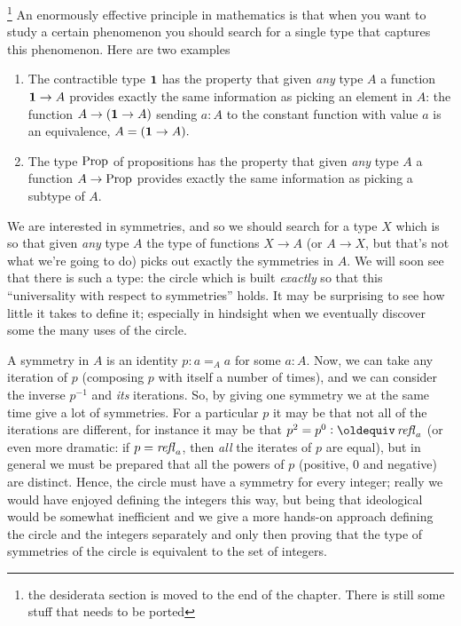 



\label{sec:sec:circle}\footnote{the desiderata section is moved to the end of the chapter.  There is still some stuff that needs to be ported}
An enormously effective principle in mathematics is that when you want to study a certain phenomenon you should search for a single type that captures this phenomenon.  Here are two examples
\begin{enumerate}
\item The contractible type $\mathbf{1}$ has the property that given \emph{any} type $A$ a function $\mathbf{1}\to A$ provides exactly the same information as picking an element in $A$: the function $A\to (\mathbf{1}\to A)$ sending $a:A$ to the constant function with value $a$ is an equivalence, \ie 
$A=(\mathbf{1}\to A).$
\item The type $\mathord{\mathrm{Prop}}$ of propositions has the property that given \emph{any} type $A$ a function $A\to\mathord{\mathrm{Prop}}$ provides exactly the same information as picking a subtype of $A$.
\end{enumerate}
We are interested in symmetries, and so we should search for a type $X$ which is so that given \emph{any} type $A$ the type of functions $X\to A$ (or $A\to X$, but that's not what we're going to do) picks out exactly the symmetries in $A$.  We will soon see that there is such a type: the circle which is built \emph{exactly} so that this ``universality with respect to symmetries'' holds.  It may be surprising to see how little it takes to define it; especially in hindsight when we eventually discover some the many uses of the circle.

A symmetry in $A$ is an identity $p:a=_Aa$ for some $a:A$.  Now, we can take any iteration of $p$ (composing $p$ with itself a number of times), and we can consider the inverse $p^{-1}$ and \emph{its} iterations.  So, by giving one symmetry we at the same time give a lot of symmetries.  For a particular $p$ it may be that not all of the iterations are different, for instance it may be that $p^2=p^0\defequi\refl a$ (or even more dramatic: if  $p=\mathop{{\it refl}_{a}}$, then \emph{all} the iterates of $p$ are equal), but in general we must be prepared that all the powers of $p$ (positive, $0$ and negative) are distinct.  Hence, the circle must have a symmetry for every integer; really we would have enjoyed defining the integers this way, but being that ideological would be somewhat inefficient and we give a more hands-on approach defining the circle and the integers separately and only then proving that the type of symmetries of the circle is equivalent to the set of integers. 

